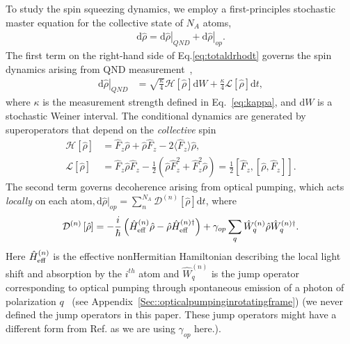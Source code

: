 \documentclass[preprint,aps,pra,onecolumn,superscriptaddress]{revtex4-1} %
\newcommand{\expect}[1]{\big\langle #1 \big\rangle}
\newcommand{\comment}[1]{{\color{Maroon} #1}}
\begin{document}
To study the spin squeezing dynamics, we employ a first-principles stochastic master equation for the collective state of $N_A$ atoms,
\begin{align}\label{eq:totaldrhodt}
\mathrm{d}\hat{\rho}= \left.\mathrm{d}\hat{\rho}\right|_{QND}+\left.\mathrm{d}\hat{\rho}\right|_{op}.
\end{align}
The first term on the right-hand side of Eq.\eqref{eq:totaldrhodt} governs the spin dynamics arising from QND measurement~\cite{Jacobs2006,Baragiola2014},
\begin{align}
\left.\mathrm{d}\hat{\rho}\right|_{QND} &= \sqrt{\frac{\kappa}{4}}\mathcal{H}\left[\hat{\rho} \right]\mathrm{d}W + \frac{\kappa}{4}\mathcal{L}\left[ \hat{\rho}\right]\mathrm{d}t, 
\end{align}
where  $\kappa$ is the measurement strength defined in Eq.~\eqref{eq:kappa}, and $\mathrm{d}W$ is a stochastic Weiner interval. The conditional dynamics are generated by superoperators that depend on the {\em collective} spin
\begin{subequations}
\begin{align}
\mathcal{H}\left[ \hat{\rho}\right] &= \hat{F}_z \hat{\rho} + \hat{\rho}\hat{F}_z -2\expect{\hat{F}_z}\hat{\rho}, \\
\mathcal{L}\left[ \hat{\rho} \right] &= \hat{F}_z \hat{\rho}\hat{F}_z -\frac{1}{2}\left(\hat{\rho}\hat{F}_z^2+\hat{F}_z^2\hat{\rho} \right)=\frac{1}{2}\left[\hat{F}_z,\left[\hat{\rho},\hat{F}_z \right] \right].
\end{align}
\end{subequations}
The second term governs decoherence arising from optical pumping, which acts {\em locally} on each atom$,\mathrm{d}\hat{\rho}|_{op}=\sum_n^{N_A} \mathcal{D}^{(n)}\left[ \hat{\rho}\right] \mathrm{d}t$, where 
\begin{equation}
\mathcal{D}^{(n)}\left[ \hat{\rho}\right] = -\frac{i}{\hbar}\left(\hat{H}^{(n)}_{\rm eff}\hat{\rho} - \hat{\rho} \hat{H}^{(n)\dag}_{\rm eff}\right) + \gamma_{op} \sum_q \hat{W}^{(n)}_q \hat{\rho}\hat{W}^{(n)\dag}_q.
\label{op_superator}
\end{equation}
Here $\hat{H}^{(n)}_{\rm eff}$ is the effective nonHermitian Hamiltonian describing the local light shift and absorption by the $i^{th}$ atom and $\hat{W}^{(n)}_q$ is the jump operator corresponding to optical pumping through spontaneous emission of a photon of polarization $q$~\cite{Deutsch2010a} (see Appendix~\ref{Sec::opticalpumpinginrotatingframe}) \comment{(we never defined the jump operators in this paper. These jump operators might have a different form from Ref.\cite{Deutsch2010a} as we are using $ \gamma_{op} $ here.)}.   
\end{document}

